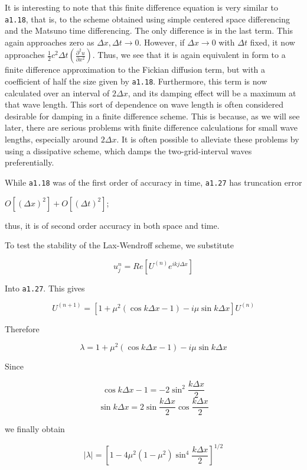 It is interesting to note that this finite difference equation is very
similar to \texttt{a1.18}, that is, to the scheme obtained using simple
centered space differencing and the Matsuno time differencing. The only
difference is in the last term. This again approaches zero as
\(\Delta x,\Delta t \rightarrow 0\). However, if
\(\Delta x \rightarrow 0\) with \(\Delta t\) fixed, it now approaches
\(\frac{1}{2}c^{2}\Delta t\left( \frac{\partial^{2}u}{\partial x^{2}} \right)\).
Thus, we see that it is again equivalent in form to a finite difference
approximation to the Fickian diffusion term, but with a coefficient of
half the size given by \texttt{a1.18}. Furthermore, this term is now
calculated over an interval of \(2\Delta x\), and its damping effect
will be a maximum at that wave length. This sort of dependence on wave
length is often considered desirable for damping in a finite difference
scheme. This is because, as we will see later, there are serious
problems with finite difference calculations for small wave lengths,
especially around \(2\Delta x\). It is often possible to alleviate these
problems by using a dissipative scheme, which damps the
two-grid-interval waves preferentially.

While \texttt{a1.18} was of the first order of accuracy in time,
\texttt{a1.27} has truncation error

\(O\left\lbrack \left( \Delta x \right)^{2} \right\rbrack + O\left\lbrack \left( \Delta t \right)^{2} \right\rbrack\);

thus, it is of second order accuracy in both space and time.

To test the stability of the Lax-Wendroff scheme, we substitute

 \[u_{j}^{n} = Re\left\lbrack U^{\left( n \right)}e^{i  k  j \Delta x} \right\rbrack\]

Into \texttt{a1.27}. This gives

 \[U^{\left( n + 1 \right)} = \left\lbrack 1 + \mu^{2}\left( \cos{k\Delta x - 1} \right) -
i\mu\sin{k\Delta x} \right\rbrack U^{\left( n \right)}\]

Therefore

 \[\lambda = 1 + \mu^{2}\left( \cos{k\Delta x - 1} \right) - i\mu\sin{k\Delta x}\]

Since

\[\cos{k\Delta x - 1} = - 2\sin^{2}\frac{k\Delta x}{2}\]\[\sin{k\Delta x} = 2\sin\frac{k\Delta x}{2}\cos\frac{k\Delta x}{2}\]

we finally obtain

 \[|\lambda| = \left\lbrack  1 - 4\mu^{2}( 1 - \mu^{2} )\sin^{4}\frac{k\Delta x}{2} \right\rbrack^{1/2}\]

